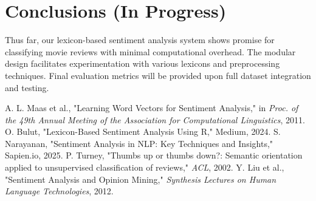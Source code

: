 \documentclass[conference]{IEEEtran}
\begin{document}
	\section{Conclusions (In Progress)}
	Thus far, our lexicon-based sentiment analysis system shows promise for classifying movie reviews with minimal computational overhead. The modular design facilitates experimentation with various lexicons and preprocessing techniques. Final evaluation metrics will be provided upon full dataset integration and testing.
	
	\begin{thebibliography}{00}
		 A. L. Maas et al., "Learning Word Vectors for Sentiment Analysis," in \textit{Proc. of the 49th Annual Meeting of the Association for Computational Linguistics}, 2011.
		 O. Bulut, "Lexicon-Based Sentiment Analysis Using R," Medium, 2024.
		 S. Narayanan, "Sentiment Analysis in NLP: Key Techniques and Insights," Sapien.io, 2025.
		 P. Turney, "Thumbs up or thumbs down?: Semantic orientation applied to unsupervised classification of reviews," \textit{ACL}, 2002.
		 Y. Liu et al., "Sentiment Analysis and Opinion Mining," \textit{Synthesis Lectures on Human Language Technologies}, 2012.
	\end{thebibliography}
	
\end{document}
